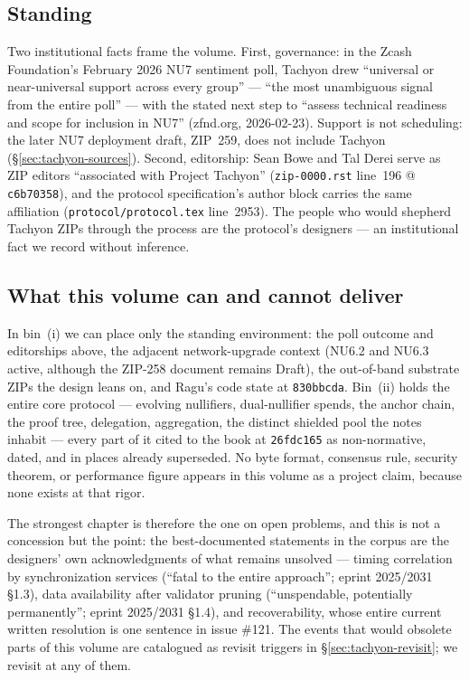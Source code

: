 \documentclass[11pt,a4paper]{article}
\theoremstyle{definition}
\begin{document}
\subsection{Standing}\label{sec:tachyon-standing}

Two institutional facts frame the volume. First, governance: in the Zcash
Foundation's February 2026 NU7 sentiment poll, Tachyon drew ``universal or
near-universal support across every group'' --- ``the most unambiguous signal
from the entire poll'' --- with the stated next step to ``assess technical
readiness and scope for inclusion in NU7'' (zfnd.org, 2026-02-23). Support is
not scheduling: the later NU7 deployment draft, ZIP~259, does not include
Tachyon (\S\ref{sec:tachyon-sources}).
Second, editorship: Sean Bowe and Tal Derei serve as ZIP editors ``associated
with Project Tachyon'' (\texttt{zip-0000.rst} line~196 @ \texttt{c6b70358}),
and the protocol specification's author block carries the same affiliation
(\texttt{protocol/protocol.tex} line~2953). The people who would shepherd
Tachyon ZIPs through the process are the protocol's designers --- an
institutional fact we record without inference.

\subsection{What this volume can and cannot deliver}\label{sec:tachyon-expect}

In bin~(i) we can place only the standing environment: the poll outcome and
editorships above,
the adjacent network-upgrade context (NU6.2 and NU6.3 active, although the
ZIP-258 document remains Draft), the
out-of-band substrate ZIPs the design leans on, and Ragu's code state at
\texttt{830bbcda}. Bin~(ii) holds the entire core protocol --- evolving
nullifiers, dual-nullifier spends, the anchor chain, the proof tree,
delegation, aggregation, the distinct shielded pool the notes inhabit ---
every part of it cited to the book at \texttt{26fdc165} as non-normative,
dated, and in places already
superseded. No byte format, consensus rule, security theorem, or performance
figure appears in this volume as a project claim, because none exists at that
rigor.

The strongest chapter is therefore the one on open problems, and this is not a
concession but the point: the best-documented statements in the corpus are the
designers' own acknowledgments of what remains unsolved --- timing correlation
by synchronization services (``fatal to the entire approach''; eprint
2025/2031 \S1.3), data availability after validator pruning (``unspendable,
potentially permanently''; eprint 2025/2031 \S1.4), and recoverability, whose
entire current written resolution is one sentence in issue \#121. The events
that would obsolete parts of this volume are catalogued as revisit triggers
in \S\ref{sec:tachyon-revisit}; we revisit at any of them.
\end{document}

